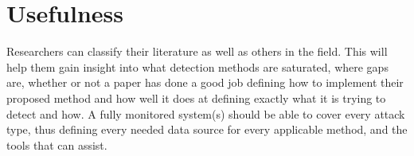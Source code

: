 \section{Usefulness}
 Researchers can classify their literature as well as others in the field.
 This will help them gain insight into what detection methods are saturated, where gaps are, whether or not a paper has done a good job defining how to implement their proposed method and how well it does at defining exactly what it is trying to detect and how. 
 A fully monitored system(s) should be able to cover every attack type, thus defining every needed data source for every applicable method, and the tools that can assist. 